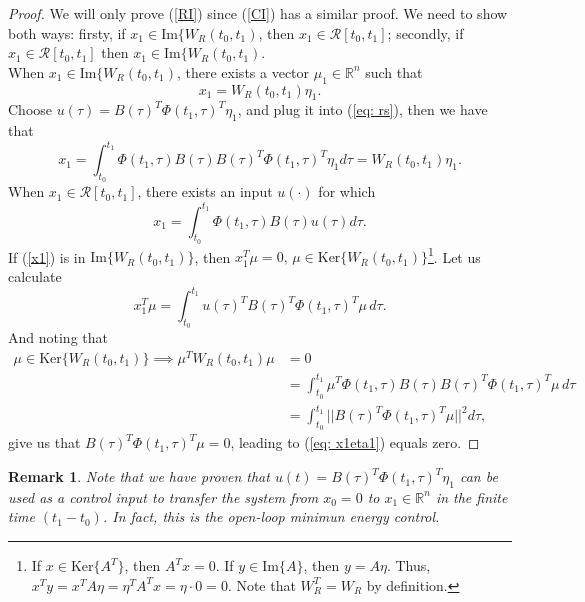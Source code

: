 \documentclass[11pt,a4paper,titlepage]{article}
\newtheorem{remark}{Remark}
\begin{document}
\begin{proof}
	We will only prove (\ref{RI}) since (\ref{CI}) has a similar proof.
	We need to show both ways: firsty, if $x_1 \in \text{Im}\{W_R(t_0,t_1)$, then $x_1 \in \mathcal{R}[t_0,t_1]$; secondly, if $x_1 \in \mathcal{R}[t_0,t_1]$ then $x_1 \in \text{Im}\{W_R(t_0,t_1)$.\\
	When $x_1 \in \text{Im}\{W_R(t_0,t_1)$, there exists a vector $\mu_1\in\mathbb{R}^n$ such that
	\begin{equation}
	x_1 = W_R(t_0,t_1)\eta_1.
	\end{equation}
	Choose $u(\tau) = B(\tau)^T\Phi(t_1, \tau)^T\eta_1$, and plug it into (\ref{eq: rs}), then we have that
	\begin{equation}
	x_1 = \int_{t_0}^{t_1} \Phi(t_1,\tau)B(\tau) B(\tau)^T\Phi(t_1, \tau)^T \eta_1d\tau = W_R(t_0,t_1)\eta_1.
	\end{equation}
	When $x_1 \in \mathcal{R}[t_0,t_1]$, there exists an input $u(\cdot)$ for which
	\begin{equation}
		x_1 = \int_{t_0}^{t_1} \Phi(t_1,\tau)B(\tau)u(\tau)d\tau.
		\label{x1}
	\end{equation}
	If (\ref{x1}) is in $\text{Im}\{W_R(t_0,t_1)\}$, then $x_1^T\mu = 0, \, \mu \in \text{Ker}\{W_R(t_0,t_1)\}$\footnote{If $x\in\text{Ker}\{A^T\}$, then $A^Tx = 0$. If $y\in\text{Im}\{A\}$, then $y = A\eta$. Thus, $x^Ty = x^TA\eta = \eta^TA^Tx = \eta \cdot 0 = 0$. Note that $W_R^T = W_R$ by definition.}. Let us calculate
	\begin{equation}
		x_1^T\mu = \int_{t_0}^{t_1}u(\tau)^TB(\tau)^T\Phi(t_1,\tau)^T\mu \, d\tau. \label{eq: x1eta1}
	\end{equation}
	And noting that
	\begin{align}
	\mu \in \text{Ker}\{W_R(t_0,t_1)\} \implies \mu^TW_R(t_0,t_1)\mu &= 0 \nonumber \\ &= \int_{t_0}^{t_1}\mu^T \Phi(t_1,\tau)B(\tau)B(\tau)^T\Phi(t_1,\tau)^T \mu \, d\tau \nonumber \\ &= \int_{t_0}^{t_1} ||B(\tau)^T\Phi(t_1,\tau)^T \mu||^2 d \tau,
	\end{align}
	give us that $B(\tau)^T\Phi(t_1,\tau)^T \mu  = 0$, leading to (\ref{eq: x1eta1}) equals zero.
\end{proof}
\begin{remark}
Note that we have proven that $u(t) = B(\tau)^T\Phi(t_1,\tau)^T \eta_1$ can be used as a control input to transfer the system from $x_0 = 0$ to $x_1\in\mathbb{R}^n$ in the finite time $(t_1 - t_0)$. In fact, this is the \emph{open-loop minimun energy control}.
\end{remark}
\end{document}
